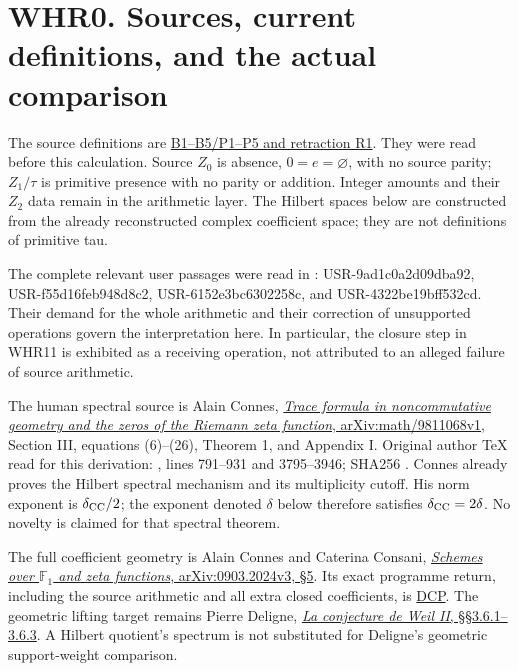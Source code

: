 \section{WHR0. Sources, current definitions, and the actual
comparison}\label{whr0.-sources-current-definitions-and-the-actual-comparison}

The source definitions are
\href{https://github.com/KokunoYumeto/zeta-function-research-reader/blob/36a82ecca98addb8a98b48204e349737856c7223/workbenches/splitzero-tandem/continuations/20260924-cohomology-weight-and-character-lifts/original-character-lifting/foundations/user_definitions_20260924/SOURCE_OPERATIONS_AND_PROOFS.md}{B1--B5/P1--P5
and retraction R1}. They were read before this calculation. Source
\(Z_0\) is absence, \(0=e=\varnothing\), with no source parity;
\(Z_1/\tau\) is primitive presence with no parity or addition. Integer
amounts and their \(Z_2\) data remain in the arithmetic layer. The
Hilbert spaces below are constructed from the already reconstructed
complex coefficient space; they are not definitions of primitive tau.

The complete relevant user passages were read in
:
USR-9ad1c0a2d09dba92, USR-f55d16feb948d8c2, USR-6152e3bc6302258c, and
USR-4322be19bff532cd. Their demand for the whole arithmetic and their
correction of unsupported operations govern the interpretation here. In
particular, the closure step in WHR11 is exhibited as a receiving
operation, not attributed to an alleged failure of source arithmetic.

The human spectral source is Alain Connes,
\href{https://arxiv.org/abs/math/9811068v1}{\emph{Trace formula in
noncommutative geometry and the zeros of the Riemann zeta function},
arXiv:math/9811068v1}, Section III, equations (6)--(26), Theorem 1, and
Appendix I. Original author TeX read for this derivation:
\href{https://arxiv.org/abs/math/9811068v1}{},
lines 791--931 and 3795--3946; SHA256
.
Connes already proves the Hilbert spectral mechanism and its
multiplicity cutoff. His norm exponent is \(\delta_{\rm CC}/2\); the
exponent denoted \(\delta\) below therefore satisfies
\(\delta_{\rm CC}=2\delta\). No novelty is claimed for that spectral
theorem.

The full coefficient geometry is Alain Connes and Caterina Consani,
\href{https://arxiv.org/abs/0903.2024v3}{\emph{Schemes over
\(\mathbb F_1\) and zeta functions}, arXiv:0903.2024v3, §5}. Its exact
programme return, including the source arithmetic and all extra closed
coefficients, is
\href{https://github.com/KokunoYumeto/zeta-function-research-reader/blob/36a82ecca98addb8a98b48204e349737856c7223/workbenches/splitzero-tandem/continuations/20260924-cohomology-weight-and-character-lifts/original-character-lifting/tau_lifting_weights_20260924/SOURCE_CC_DOUBLE_PULLBACK.md}{DCP}.
The geometric lifting target remains Pierre Deligne,
\href{https://www.numdam.org/item/PMIHES_1980__52__137_0/}{\emph{La
conjecture de Weil II}, §§3.6.1--3.6.3}. A Hilbert quotient's spectrum
is not substituted for Deligne's geometric support-weight comparison.

